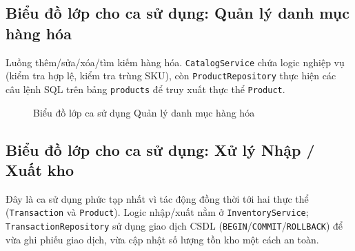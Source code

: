 \documentclass[12pt,a4paper]{report}
\begin{document}
\subsection{Biểu đồ lớp cho ca sử dụng: Quản lý danh mục hàng hóa}
Luồng thêm/sửa/xóa/tìm kiếm hàng hóa. \texttt{CatalogService} chứa logic nghiệp
vụ (kiểm tra hợp lệ, kiểm tra trùng SKU), còn \texttt{ProductRepository} thực
hiện các câu lệnh SQL trên bảng \texttt{products} để truy xuất thực thể
\texttt{Product}.

\begin{figure}[H]
\centering
{}
\caption{Biểu đồ lớp ca sử dụng Quản lý danh mục hàng hóa}
\label{fig:class-catalog}
\end{figure}

\subsection{Biểu đồ lớp cho ca sử dụng: Xử lý Nhập / Xuất kho}
Đây là ca sử dụng phức tạp nhất vì tác động đồng thời tới hai thực thể
(\texttt{Transaction} và \texttt{Product}). Logic nhập/xuất nằm ở
\texttt{InventoryService}; \texttt{TransactionRepository} sử dụng giao dịch CSDL
(\texttt{BEGIN}/\texttt{COMMIT}/\texttt{ROLLBACK}) để vừa ghi phiếu giao dịch,
vừa cập nhật số lượng tồn kho một cách an toàn.
\end{document}
